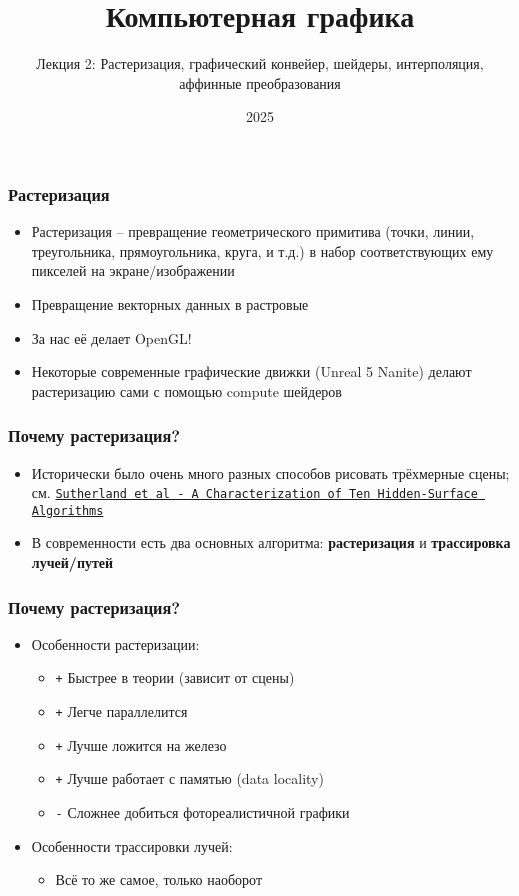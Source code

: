 \documentclass[10pt]{beamer}
\title{Компьютерная графика}
\subtitle{Лекция 2: Растеризация, графический конвейер, шейдеры, интерполяция, аффинные преобразования}
\date{2025}
\begin{document}
\frame{\titlepage}

\begin{frame}
\frametitle{Растеризация}
\begin{itemize}
\item Растеризация -- превращение геометрического примитива (точки, линии, треугольника, прямоугольника, круга, и т.д.) в набор соответствующих ему пикселей на экране/изображении
\pause
\item Превращение векторных данных в растровые
\pause
\item За нас её делает OpenGL!
\pause
\item Некоторые современные графические движки (Unreal 5 Nanite) делают растеризацию сами с помощью compute шейдеров
\end{itemize}
\end{frame}

\begin{frame}
\frametitle{Почему растеризация?}
\begin{itemize}
\item Исторически было очень много разных способов рисовать трёхмерные сцены; см. \href{https://dl.acm.org/doi/pdf/10.1145/356625.356626}{\texttt{Sutherland et al - A Characterization of Ten Hidden-Surface Algorithms}}
\pause
\item В современности есть два основных алгоритма: \textbf{растеризация} и \textbf{трассировка лучей/путей}
\end{itemize}
\end{frame}

\begin{frame}
\frametitle{Почему растеризация?}
\begin{itemize}
\item Особенности растеризации:
\begin{itemize}
\item {\color{green}\texttt{+}} Быстрее в теории (зависит от сцены)
\pause
\item {\color{green}\texttt{+}} Легче параллелится
\pause
\item {\color{green}\texttt{+}} Лучше ложится на железо
\pause
\item {\color{green}\texttt{+}} Лучше работает с памятью (data locality)
\pause
\item {\color{red}\texttt{-}} Сложнее добиться фотореалистичной графики
\end{itemize}
\pause
\item Особенности трассировки лучей:
\pause
\begin{itemize}
\item Всё то же самое, только наоборот
\end{itemize}
\end{itemize}
\end{frame}
\end{document}

